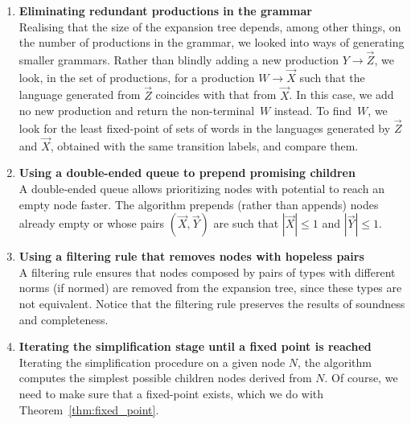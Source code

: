 \begin{enumerate}
	\item {\bf Eliminating redundant productions in the grammar} \\
	Realising that the size of 
	the expansion tree depends, among other
	things, on the number of productions in the grammar, we looked into
	ways of generating smaller grammars. Rather than blindly adding a new production
$Y \rightarrow \vec Z$, we look, in the set of productions, for a
production $W \rightarrow \vec X$ such that the language generated
from $\vec Z$ coincides with that from $\vec X$. In this
case, we add no new production and return the non-terminal~$W$ instead. To
find~$W$, we look for the least fixed-point of
sets of words in the
languages generated by $\vec Z$ and $\vec X$,
obtained with the same transition labels,
and compare them.
	\item {\bf Using a double-ended queue to prepend promising children} \\
A double-ended queue allows prioritizing nodes with potential to
reach an empty node faster.
The algorithm prepends (rather than
appends) nodes already empty or whose pairs $(\vec X, \vec Y)$
are such that $|\vec X|\leq 1$ and $|\vec Y| \leq 1$. 
	\item {\bf Using a filtering rule that removes nodes with hopeless pairs}\\
	A filtering rule
ensures that nodes composed by pairs of types with different norms (if normed)
are removed from the expansion tree, since these types are not equivalent. 
Notice that the filtering rule preserves the results of soundness and 
completeness.
	\item {\bf Iterating the simplification stage until a fixed point is reached}\\
	Iterating the simplification procedure on a given node $N$, the
algorithm computes the simplest possible children nodes derived from
$N$. Of course, we need to make sure that a fixed-point exists, which
we do with Theorem~\ref{thm:fixed_point}.
\end{enumerate}

